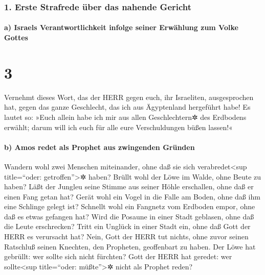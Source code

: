 \hypertarget{erste-strafrede-uxfcber-das-nahende-gericht}{%
\subsubsection{1. Erste Strafrede über das nahende
Gericht}\label{erste-strafrede-uxfcber-das-nahende-gericht}}

\hypertarget{a-israels-verantwortlichkeit-infolge-seiner-erwuxe4hlung-zum-volke-gottes}{%
\paragraph{a) Israels Verantwortlichkeit infolge seiner Erwählung zum
Volke
Gottes}\label{a-israels-verantwortlichkeit-infolge-seiner-erwuxe4hlung-zum-volke-gottes}}

\hypertarget{section-2}{%
\section{3}\label{section-2}}

Vernehmt dieses Wort, das der HERR gegen euch, ihr
Israeliten, ausgesprochen hat, gegen das ganze Geschlecht, das ich aus
Ägyptenland hergeführt habe! Es lautet so: »Euch allein
habe ich mir aus allen Geschlechtern✲ des Erdbodens erwählt; darum will
ich euch für alle eure Verschuldungen büßen lassen!«

\hypertarget{b-amos-redet-als-prophet-aus-zwingenden-gruxfcnden}{%
\paragraph{b) Amos redet als Prophet aus zwingenden
Gründen}\label{b-amos-redet-als-prophet-aus-zwingenden-gruxfcnden}}

Wandern wohl zwei Menschen miteinander, ohne daß sie sich
verabredet\textless sup title=``oder: getroffen''\textgreater✲ haben?
Brüllt wohl der Löwe im Walde, ohne Beute zu haben? Läßt
der Jungleu seine Stimme aus seiner Höhle erschallen, ohne daß er einen
Fang getan hat? Gerät wohl ein Vogel in die Falle am
Boden, ohne daß ihm eine Schlinge gelegt ist? Schnellt wohl ein Fangnetz
vom Erdboden empor, ohne daß es etwas gefangen hat? Wird
die Posaune in einer Stadt geblasen, ohne daß die Leute erschrecken?
Tritt ein Unglück in einer Stadt ein, ohne daß Gott der HERR es
verursacht hat? Nein, Gott der HERR tut nichts, ohne zuvor
seinen Ratschluß seinen Knechten, den Propheten, geoffenbart zu haben.
Der Löwe hat gebrüllt: wer sollte sich nicht fürchten?
Gott der HERR hat geredet: wer sollte\textless sup title=``oder:
müßte''\textgreater✲ nicht als Prophet reden?

